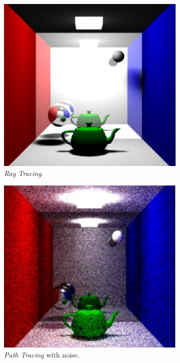 \documentclass[titlepage,12pt]{report}
\begin{document}
\begin{figure}[H]
	\centering
	\begin{subfigure}{.3\textwidth}
		\centering
		\includegraphics[width=.8\textwidth]{media/RayTracing.png}
		\caption{\textit{Ray Tracing}.}
		\label{RT}
	\end{subfigure}
	\begin{subfigure}{.3\textwidth}
		\centering
		\includegraphics[width=.8\textwidth]{media/PathTracing.png}
		\caption{\textit{Path Tracing} with noise.}
		\label{PTN}
	\end{subfigure}
	\begin{subfigure}{.3\textwidth}
		\centering

\end{subfigure}
\end{figure}
\end{document}
